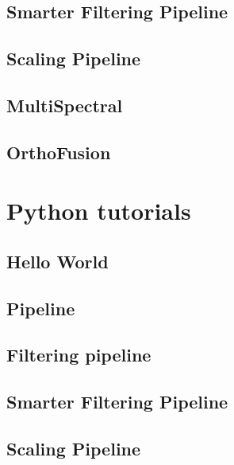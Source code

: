 \subsection{Smarter Filtering Pipeline}


\subsection{Scaling Pipeline}


\subsection{MultiSpectral}


\subsection{OrthoFusion}



\normalsize
\section{Python tutorials}\label{sec:tutoPython}

\subsection{Hello World}


\subsection{Pipeline}


\subsection{Filtering pipeline}


\subsection{Smarter Filtering Pipeline}


\subsection{Scaling Pipeline}


